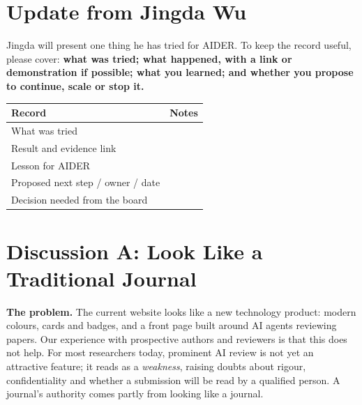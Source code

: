 \documentclass[11pt]{article}
\begin{document}
\section{Update from Jingda Wu}

Jingda will present one thing he has tried for AIDER. To keep the record useful, please cover: \textbf{what was tried; what happened, with a link or demonstration if possible; what you learned; and whether you propose to continue, scale or stop it.}

{\small\renewcommand{\arraystretch}{1.25}
\begin{center}
\begin{tabular}{@{}p{5.2cm}p{8.9cm}@{}}
\toprule
\textbf{Record} & \textbf{Notes} \\
\midrule
What was tried & \\[9pt]
Result and evidence link & \\[9pt]
Lesson for AIDER & \\[9pt]
Proposed next step / owner / date & \\[9pt]
Decision needed from the board & \\[9pt]
\bottomrule
\end{tabular}
\end{center}}

\section{Discussion A: Look Like a Traditional Journal}

\textbf{The problem.} The current website looks like a new technology product: modern colours, cards and badges, and a front page built around AI agents reviewing papers. Our experience with prospective authors and reviewers is that this does not help. For most researchers today, prominent AI review is not yet an attractive feature; it reads as a \emph{weakness}, raising doubts about rigour, confidentiality and whether a submission will be read by a qualified person. A journal's authority comes partly from looking like a journal.
\end{document}
